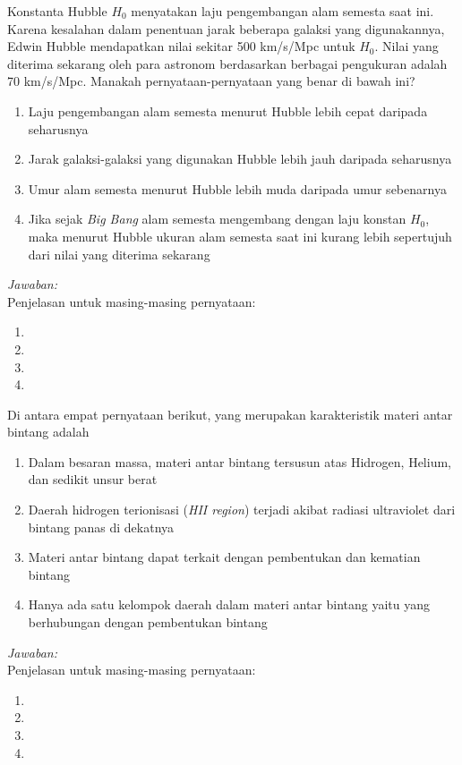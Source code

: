 \documentclass[11pt,fleqn, a4paper]{exam}
\begin{document}
\begin{questions}
\vspace{0.5cm}
\question Konstanta Hubble $H_0$ menyatakan laju pengembangan alam semesta saat ini. Karena kesalahan dalam penentuan jarak beberapa galaksi yang digunakannya, Edwin Hubble mendapatkan nilai sekitar 500 km/s/Mpc untuk $H_0$. Nilai yang diterima sekarang oleh para astronom berdasarkan berbagai pengukuran adalah 70 km/s/Mpc. Manakah pernyataan-pernyataan yang benar di bawah ini?
\begin{enumerate}
\item Laju pengembangan alam semesta menurut Hubble lebih cepat daripada seharusnya
\item Jarak galaksi-galaksi yang digunakan Hubble lebih jauh daripada seharusnya
\item Umur alam semesta menurut Hubble lebih muda daripada umur sebenarnya
\item Jika sejak \textit{Big Bang} alam semesta mengembang dengan laju konstan $H_0$, maka menurut Hubble ukuran alam semesta saat ini kurang lebih sepertujuh dari nilai yang diterima sekarang
\end{enumerate}

\textit{Jawaban: }\\
Penjelasan untuk masing-masing pernyataan:
\begin{enumerate}
\item 
\item 
\item 
\item 
\end{enumerate}


\vspace{0.5cm}
\question Di antara empat pernyataan berikut, yang merupakan karakteristik materi antar bintang adalah
\begin{enumerate}
\item Dalam besaran massa, materi antar bintang tersusun atas Hidrogen, Helium, dan sedikit unsur berat 
\item Daerah hidrogen terionisasi (\textit{HII region}) terjadi akibat radiasi ultraviolet dari bintang panas di dekatnya
\item Materi antar bintang dapat terkait dengan pembentukan dan kematian bintang
\item Hanya ada satu kelompok daerah dalam materi antar bintang yaitu yang berhubungan dengan pembentukan bintang
\end{enumerate}

\textit{Jawaban: }\\
Penjelasan untuk masing-masing pernyataan:
\begin{enumerate}
\item 
\item 
\item 
\item 
\end{enumerate}



\end{questions}
\end{document}
